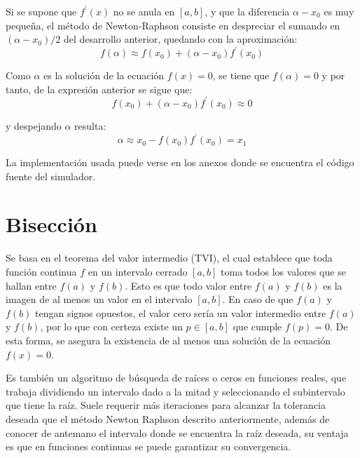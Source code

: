 \par Si se supone que $f^\prime(x)$ no se anula en $[a,b]$, y que la diferencia $\alpha-x_0$ es muy pequeña, el método de Newton-Raphson consiste en despreciar el sumando en $(\alpha-x_0)/2$ del desarrollo anterior, quedando con la aproximación:
\begin{equation*}
f(\alpha) \approx f(x_0) + (\alpha-x_0)f^\prime(x_0)
\end{equation*}
\par Como $\alpha$ es la solución de la ecuación $f(x)=0$, se tiene que $f(\alpha)=0$ y por tanto, de la expresión anterior se sigue que:
\begin{equation*}
f(x_0)+(\alpha-x_0)f^\prime(x_0) \approx 0
\end{equation*}
\par y despejando $\alpha$ resulta:
\begin{equation*}
\alpha \approx x_0 - f(x_0)f^\prime(x_0) = x_1
\end{equation*}
\par La implementación usada puede verse en los anexos donde se encuentra el código fuente del simulador.

\section{Bisección}
\par Se basa en el teorema del valor intermedio (TVI), el cual establece que toda función continua $f$ en un intervalo cerrado $[a,b]$ toma todos los valores que se hallan entre $f(a)$ y $f(b)$. Esto es que todo valor entre $f(a)$ y $f(b)$ es la imagen de al menos un valor en el intervalo $[a,b]$. En caso de que $f(a)$ y $f(b)$ tengan signos opuestos, el valor cero sería un valor intermedio entre $f(a)$ y $f(b)$, por lo que con certeza existe un  $p\in [a,b]$ que cumple  $f(p)=0$. De esta forma, se asegura la existencia de al menos una solución de la ecuación $f(x)=0$.
\par Es también un algoritmo de búsqueda de raíces o ceros en funciones reales, que trabaja dividiendo un intervalo dado a la mitad y seleccionando el subintervalo que tiene la raíz. Suele requerir más iteraciones para alcanzar la tolerancia deseada que el método Newton Raphson descrito anteriormente, además de conocer de antemano el intervalo donde se encuentra la raíz deseada, su ventaja es que en funciones continuas se puede garantizar su convergencia.